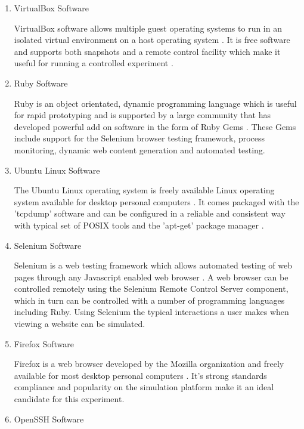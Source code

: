 \begin{enumerate}
  \item VirtualBox Software

  VirtualBox software allows multiple guest operating systems to run in an
  isolated virtual environment on a host operating system \parencite{:fk}.
  It is free software and supports both snapshots and a remote control facility
  which make it useful for running a controlled experiment \parencite{:uq}.

  \item Ruby Software

  Ruby is an object orientated, dynamic programming language which is useful for
  rapid prototyping and is supported by a large community that has developed
  powerful add on software in the form of Ruby Gems \parencite{:2010uq}. These
  Gems include support for the Selenium browser testing framework, process
  monitoring, dynamic web content generation and automated testing.

  \item Ubuntu Linux Software

  The Ubuntu Linux operating system is freely available Linux operating system
  available for desktop personal computers \parencite{:2010ly}. It comes
  packaged with the 'tcpdump' software and can be configured in a reliable and
  consistent way with typical set of POSIX tools and the 'apt-get' package
  manager \parencite{Pereira:2011uq}.

  \item Selenium Software

  Selenium is a web testing framework which allows automated testing of web pages
  through any Javascript enabled web browser \parencite{:2010ys}. A web browser
  can be controlled remotely using the Selenium Remote Control Server component,
  which in turn can be controlled with a number of programming languages including
  Ruby. Using Selenium the typical interactions a user makes when viewing a
  website can be simulated.

  \item Firefox Software

  Firefox is a web browser developed by the Mozilla organization and freely
  available for most desktop personal computers \parencite{Foundation:2011fk}.
  It's strong standards compliance \parencite{Hammond:2010fk} and popularity
  \parencite{:2010kx,:2010vn} on the simulation platform make it an ideal
  candidate for this experiment.

  \item OpenSSH Software


\end{enumerate}
